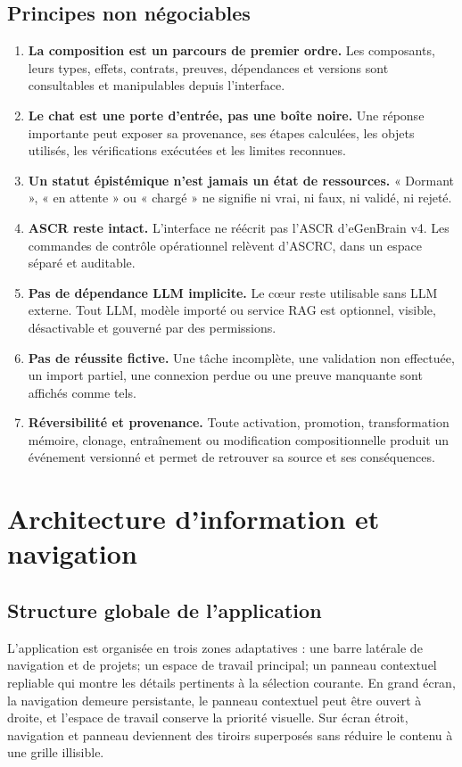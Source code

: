 \documentclass[11pt,a4paper]{article}
\begin{document}
\subsection{Principes non négociables}
\begin{enumerate}
\item \textbf{La composition est un parcours de premier ordre.} Les composants, leurs types, effets, contrats, preuves, dépendances et versions sont consultables et manipulables depuis l'interface.
\item \textbf{Le chat est une porte d'entrée, pas une boîte noire.} Une réponse importante peut exposer sa provenance, ses étapes calculées, les objets utilisés, les vérifications exécutées et les limites reconnues.
\item \textbf{Un statut épistémique n'est jamais un état de ressources.} « Dormant », « en attente » ou « chargé » ne signifie ni vrai, ni faux, ni validé, ni rejeté.
\item \textbf{ASCR reste intact.} L'interface ne réécrit pas l'ASCR d'eGenBrain v4. Les commandes de contrôle opérationnel relèvent d'ASCRC, dans un espace séparé et auditable.
\item \textbf{Pas de dépendance LLM implicite.} Le cœur reste utilisable sans LLM externe. Tout LLM, modèle importé ou service RAG est optionnel, visible, désactivable et gouverné par des permissions.
\item \textbf{Pas de réussite fictive.} Une tâche incomplète, une validation non effectuée, un import partiel, une connexion perdue ou une preuve manquante sont affichés comme tels.
\item \textbf{Réversibilité et provenance.} Toute activation, promotion, transformation mémoire, clonage, entraînement ou modification compositionnelle produit un événement versionné et permet de retrouver sa source et ses conséquences.
\end{enumerate}

\section{Architecture d'information et navigation}
\subsection{Structure globale de l'application}
L'application est organisée en trois zones adaptatives : une barre latérale de navigation et de projets; un espace de travail principal; un panneau contextuel repliable qui montre les détails pertinents à la sélection courante. En grand écran, la navigation demeure persistante, le panneau contextuel peut être ouvert à droite, et l'espace de travail conserve la priorité visuelle. Sur écran étroit, navigation et panneau deviennent des tiroirs superposés sans réduire le contenu à une grille illisible.
\end{document}
